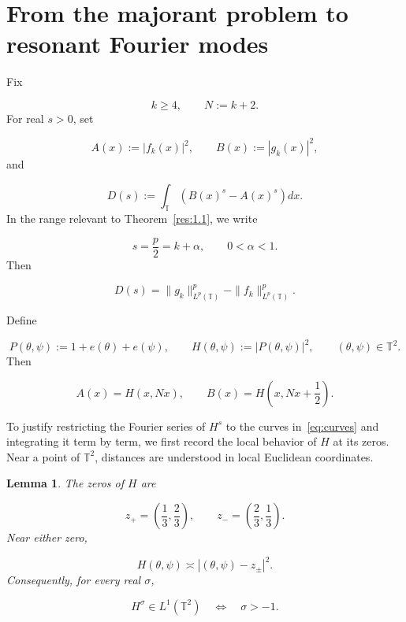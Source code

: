 \documentclass[11pt]{article}
\theoremstyle{plain}
\newtheorem{lemma}[theorem]{Lemma}
\theoremstyle{definition}
\theoremstyle{remark}
\begin{document}
\section{From the majorant problem to resonant Fourier modes}\label{sec:reduction}

Fix

\[
  k \ge 4, \qquad  N := k+2 .
\]
For real $s > 0$, set

\[
  A(x) := |f_k(x)|^{2} , \qquad  B(x) := |g_k(x)|^{2} ,
\]
and

\[
  D(s) := \int_{\mathbb{T}} \left( B(x)^s - A(x)^s \right) dx .
\]
In the range relevant to Theorem~\ref{res:1.1}, we write

\[
  s = \frac{p}{2} = k + \alpha , \qquad  0 < \alpha < 1 .
\]
Then

\begin{equation}\label{eq:Dnorm}
  D(s) = \|g_k\|_{L^p(\mathbb{T})}^{p} - \|f_k\|_{L^p(\mathbb{T})}^{p} .
\end{equation}

Define

\[
  P(\theta ,\psi ) := 1 + e(\theta ) + e(\psi ) , \qquad  H(\theta ,\psi ) := |P(\theta ,\psi )|^{2} , \qquad  (\theta ,\psi ) \in \mathbb{T}^{2} .
\]
Then

\begin{equation}\label{eq:curves}
  A(x) = H(x, Nx) , \qquad  B(x) = H\left( x, Nx + \frac{1}{2} \right) .
\end{equation}

To justify restricting the Fourier series of $H^s$ to the curves in~\eqref{eq:curves} and integrating it term by term, we first record the local behavior of $H$ at its zeros. Near a point of $\mathbb{T}^{2}$, distances are understood in local Euclidean coordinates.

\begin{lemma}\label{res:2.1}
The zeros of $H$ are

\[
  z_{+} = \left( \frac{1}{3}, \frac{2}{3} \right) , \qquad  z_{-} = \left( \frac{2}{3}, \frac{1}{3} \right) .
\]
Near either zero,

\begin{equation}\label{eq:quadzero}
  H(\theta ,\psi ) \asymp |(\theta ,\psi ) - z_\pm |^{2} .
\end{equation}
Consequently, for every real $\sigma$,

\begin{equation}\label{eq:L1crit}
  H^\sigma \in L^{1}(\mathbb{T}^{2}) \quad  \Longleftrightarrow \quad  \sigma > -1 .
\end{equation}
\end{lemma}
\end{document}
